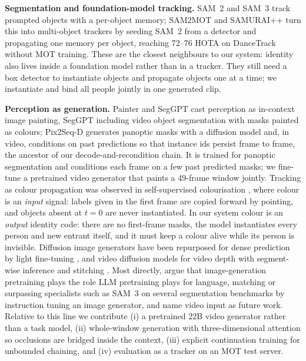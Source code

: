 \documentclass{article} %
\newcommand{\rev}[1]{#1}
\begin{document}
\textbf{Segmentation and foundation-model tracking.} SAM~2 \citep{ravi2025sam2} and SAM~3
\citep{carion2026sam3} track prompted objects with a per-object memory; SAM2MOT
\citep{jiang2026sam2mot} and SAMURAI++ \citep{yang2026samuraipp} turn this into
multi-object trackers by seeding SAM~2 from a detector and propagating one memory per
object, reaching 72--76 HOTA on DanceTrack without MOT training. These are the closest
neighbours to our system: identity also lives inside a foundation model rather than in a
tracker. They still need a box detector to instantiate objects and propagate objects one at
a time; we instantiate and bind all people jointly in one generated clip.

\textbf{Perception as generation.} Painter \citep{wang2023painter} and SegGPT
\citep{wang2023seggpt} cast perception as in-context image painting, SegGPT including
video object segmentation with masks painted as colours; Pix2Seq-D \citep{chen2023pix2seqd}
generates panoptic masks with a diffusion model and, in video, conditions on past
predictions so that instance ids persist frame to frame, the ancestor of our
decode-and-recondition chain\rev{. It is trained for panoptic segmentation and conditions
each frame on a few past predicted masks; we fine-tune a pretrained video generator
that paints a 49-frame window jointly}.
Tracking as colour propagation was observed in
self-supervised colourisation \citep{vondrick2018colorize}\rev{, where colour is an
\emph{input} signal: labels given in the first frame are copied forward by pointing, and
objects absent at $t{=}0$ are never instantiated. In our system colour is an \emph{output}
identity code: there are no first-frame masks, the model instantiates every person and
new entrant itself, and it must keep a colour alive while its person is invisible}.
Diffusion image generators have
been repurposed for dense prediction by light fine-tuning \citep{ke2024marigold}, and video
diffusion models for video depth with segment-wise inference and stitching
\citep{hu2025depthcrafter,chen2025videodepthanything}. Most directly,
\citet{gabeur2026imagegen} argue that image-generation pretraining plays the role LLM
pretraining plays for language, matching or surpassing specialists such as SAM~3 on several
segmentation benchmarks by instruction tuning an image generator, and name video input as
future work. Relative to this line we contribute (i) a pretrained 22B video generator
rather than a task model, (ii) whole-window generation with three-dimensional attention so
occlusions are bridged inside the context, (iii) explicit continuation training for
unbounded chaining, and (iv) evaluation as a tracker on an MOT test server.
\end{document}
